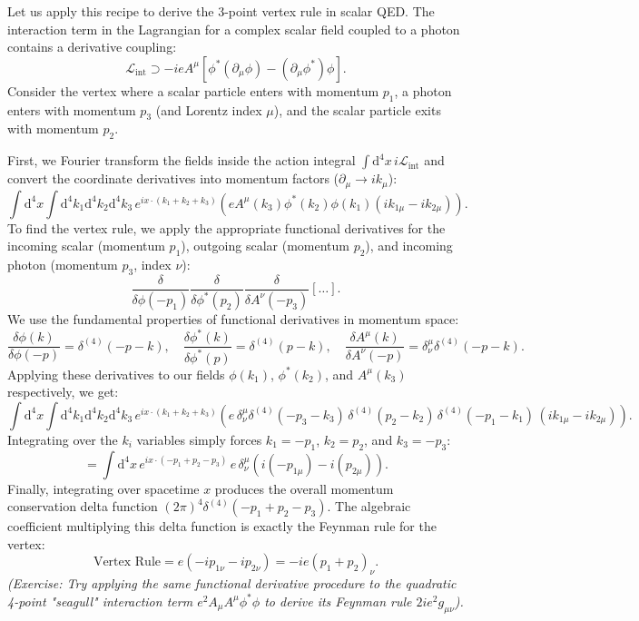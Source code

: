 \begin{example}
    Let us apply this recipe to derive the 3-point vertex rule in scalar QED. The interaction term in the Lagrangian for a complex scalar field coupled to a photon contains a derivative coupling:
    \[
        \mathcal{L}_{\text{int}} \supset -ie A^\mu [ \phi^* (\partial_\mu \phi) - (\partial_\mu \phi^*) \phi ].
    \]
    Consider the vertex where a scalar particle enters with momentum $p_1$, a photon enters with momentum $p_3$ (and Lorentz index $\mu$), and the scalar particle exits with momentum $p_2$.

    First, we Fourier transform the fields inside the action integral $\int \mathrm{d}^4x \, i \mathcal{L}_{\text{int}}$ and convert the coordinate derivatives into momentum factors ($\partial_\mu \to ik_\mu$):
    \[
        \int \mathrm{d}^4x \int \mathrm{d}^4k_1 \mathrm{d}^4k_2 \mathrm{d}^4k_3 \, e^{ix \cdot (k_1 + k_2 + k_3)} \left( e A^\mu(k_3) \phi^*(k_2) \phi(k_1) (ik_{1\mu} - ik_{2\mu}) \right).
    \]
    To find the vertex rule, we apply the appropriate functional derivatives for the incoming scalar (momentum $p_1$), outgoing scalar (momentum $p_2$), and incoming photon (momentum $p_3$, index $\nu$):
    \[
        \frac{\delta}{\delta \phi(-p_1)} \frac{\delta}{\delta \phi^*(p_2)} \frac{\delta}{\delta A^\nu(-p_3)} \left[ \dots \right].
    \]
    We use the fundamental properties of functional derivatives in momentum space:
    \[
        \frac{\delta \phi(k)}{\delta \phi(-p)} = \delta^{(4)}(-p-k), \quad \frac{\delta \phi^*(k)}{\delta \phi^*(p)} = \delta^{(4)}(p-k), \quad \frac{\delta A^\mu(k)}{\delta A^\nu(-p)} = \delta^\mu_\nu \delta^{(4)}(-p-k).
    \]
    Applying these derivatives to our fields $\phi(k_1)$, $\phi^*(k_2)$, and $A^\mu(k_3)$ respectively, we get:
    \[
        \int \mathrm{d}^4x \int \mathrm{d}^4k_1 \mathrm{d}^4k_2 \mathrm{d}^4k_3 \, e^{ix \cdot (k_1 + k_2 + k_3)} \left( e \, \delta^\mu_\nu \delta^{(4)}(-p_3 - k_3) \, \delta^{(4)}(p_2 - k_2) \, \delta^{(4)}(-p_1 - k_1) \, (ik_{1\mu} - ik_{2\mu}) \right).
    \]
    Integrating over the $k_i$ variables simply forces $k_1 = -p_1$, $k_2 = p_2$, and $k_3 = -p_3$:
    \[
        = \int \mathrm{d}^4x \, e^{ix \cdot (-p_1 + p_2 - p_3)} \, e \, \delta^\mu_\nu \left( i(-p_{1\mu}) - i(p_{2\mu}) \right).
    \]
    Finally, integrating over spacetime $x$ produces the overall momentum conservation delta function $(2\pi)^4\delta^{(4)}(-p_1 + p_2 - p_3)$. The algebraic coefficient multiplying this delta function is exactly the Feynman rule for the vertex:
    \[
        \text{Vertex Rule} = e (-i p_{1\nu} - i p_{2\nu}) = -ie (p_1 + p_2)_\nu.
    \]
    \textit{(Exercise: Try applying the same functional derivative procedure to the quadratic 4-point "seagull" interaction term $e^2 A_\mu A^\mu \phi^* \phi$ to derive its Feynman rule $2ie^2 g_{\mu\nu}$).}
\end{example}

